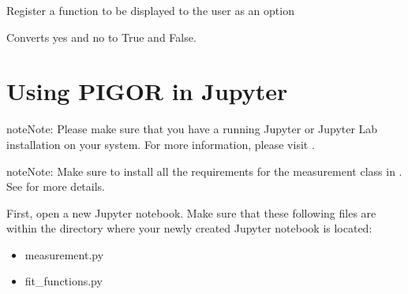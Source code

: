 \documentclass[letterpaper,10pt,english]{sphinxmanual}
\begin{document}

\begin{fulllineitems}
\label{\detokenize{pigor:pigor.show_user}}
Register a function to be displayed to the user as an option

\end{fulllineitems}


\begin{fulllineitems}
\label{\detokenize{pigor:pigor.yn2bool}}
Converts yes and no to True and False.

\end{fulllineitems}



\chapter{Using PIGOR in Jupyter}
\label{\detokenize{jupyter:using-pigor-in-jupyter}}\label{\detokenize{jupyter::doc}}
\begin{sphinxadmonition}{note}{Note:}
Please make sure that you have a running Jupyter or Jupyter Lab installation on your system. For more information, please visit .
\end{sphinxadmonition}

\begin{sphinxadmonition}{note}{Note:}
Make sure to install all the requirements for the measurement class in . See {\hyperref[\detokenize{installation:installation}]{}} for more details.
\end{sphinxadmonition}

First, open a new Jupyter notebook. Make sure that these following files are within the directory where your newly created Jupyter notebook is located:
\begin{itemize}
\item {} 
measurement.py

\item {} 
fit\_functions.py

\end{itemize}
\end{document}

